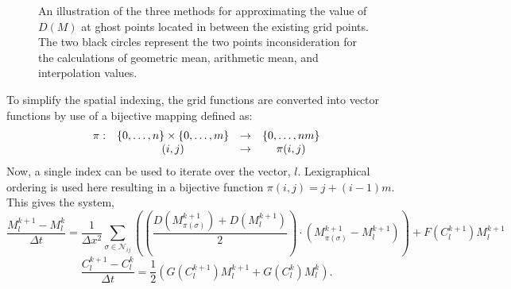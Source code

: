 \begin{figure}
  \centering
  \caption{An illustration of the three methods for approximating the value of $D(M)$ at ghost points located in between the existing grid points.
    The two black circles represent the two points inconsideration for the calculations of geometric mean, arithmetic mean, and interpolation values.
    }
  \label{fig:arithmeticMean}
\end{figure}

To simplify the spatial indexing, the grid functions are converted into vector functions by use of a bijective mapping defined as:
\begin{equation}
\begin{array}{c c c c}
  \pi :& \{ 0, \ldots, n\} \times \{0, \ldots, m\} & \to & \{0, \ldots, nm \} \\
       & (i,j)                                     & \to & \pi(i,j)
\end{array}
\end{equation}
Now, a single index can be used to iterate over the vector, $l$. 
Lexigraphical ordering is used here resulting in a bijective function $\pi(i,j) = j+ (i-1)m$.
This gives the system,
\begin{equation} \label{equ:M_space_discret}
  \frac{M^{k+1}_{l} - M^{k}_{l}}{\Delta t} =
    \frac{1}{\Delta x^2} \sum_{\sigma \in \mathcal{N}_{ij}} \left(
    \left( \frac{D(M^{k+1}_{\pi(\sigma)}) + D(M^{k+1}_{l})}{2} \right)
    \cdot \left( M^{k+1}_{\pi(\sigma)} - M^{k+1}_{l} \right) \right)
    + F(C^{k+1}_{l}) M^{k+1}_{l}
\end{equation}
\begin{equation} \label{equ:C_space_discret}
  \frac{C^{k+1}_{l} - C^{k}_{l}}{\Delta t} = \frac{1}{2} ( G(C^{k+1}_{l}) M^{k+1}_{l} + G(C^{k}_{l}) M^{k}_{l} ).
\end{equation}

